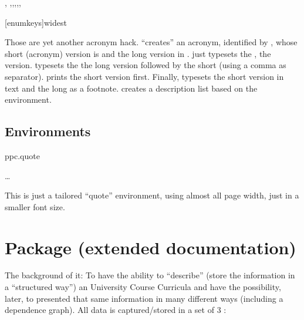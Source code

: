 \documentclass[article,nogeometry,english,tocdepth=3,secdepth=3]{ufrgscca} %
\begin{document}
\begin{codedescribe}{\acrodef, \acro,\acrol,\acrols,\acrosl,\acrofoot,\printacrolist}
    \begin{codesyntax}%
        \tsmacro{\printacrolist}[enumkeys]{widest}
    \end{codesyntax}
Those are yet another acronym hack. \tsmacro{\acrodef}{} “creates” an acronym, identified by , whose short (acronym) version is  and the long version in . \tsmacro{\acro}{} just typesets the , \tsmacro{\acrol}{} the  version.
\tsmacro{\acrols}{} typesets the the long version followed by the short (using a comma as separator).
\tsmacro{\acrosl}{} prints the short version first. Finally, \tsmacro{\acrofoot}{} typesets the short version in text and the long as a footnote. \tsmacro{\printacrolist}{} creates a description list based on the  environment.
\end{codedescribe}

\subsection{Environments}
\begin{codedescribe}[env]{ppc.quote}
    \begin{codesyntax}%
    \tsmacro{\begin{ppc.quote}}{} \ldots \tsmacro{\end{ppc.quote}}{}
    \end{codesyntax}
\end{codedescribe}
This is just a tailored “quote” environment, using almost all page width, just in a smaller font size.

\section{ Package (extended documentation)}
The background of it: To have the ability to “describe” (store the information in a “structured way”) an University Course Curricula and  have the possibility, later, to presented that same information in many different ways (including a dependence graph).  All data is captured/stored in a set of 3 :
\end{document}
